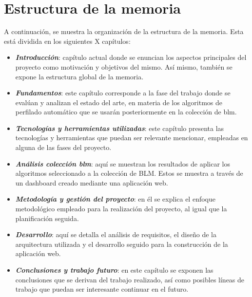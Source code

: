 \section{Estructura de la memoria}
A continuación, se muestra la organización de la estructura de la memoria. Esta está dividida en los siguientes X capítulos:
\begin{itemize}
    \item \textit{\textbf{Introducción}}: capítulo actual donde se enuncian los aspectos principales del proyecto como motivación y objetivos del mismo. Así mismo, también se expone la estructura global de la memoria.
    \item \textit{\textbf{Fundamentos}}: este capítulo corresponde a la fase del trabajo donde se evalúan y analizan el estado del arte, en materia de los algoritmos de perfilado automático que se usarán posteriormente en la colección de \acrshort{blm}.
    \item \textit{\textbf{Tecnologías y herramientas utilizadas}}: este capítulo presenta las tecnologías y herramientas que puedan ser relevante mencionar, empleadas en alguna de las fases del proyecto.
    \item \textit{\textbf{Análisis colección \acrshort{blm}}}: aquí se muestran los resultados de aplicar los algoritmos seleccionado a la colección de BLM. Estos se muestra a través de un dashboard creado mediante una aplicación web.
    \item \textit{\textbf{Metodología y gestión del proyecto}}: en él se explica el enfoque metodológico empleado para la realización del proyecto, al igual que la planificación seguida.
    \item \textit{\textbf{Desarrollo}}: aquí se detalla el análisis de requisitos, el diseño de la arquitectura utilizada y el desarrollo seguido para la construcción de la aplicación web.
    \item \textit{\textbf{Conclusiones y trabajo futuro}}: en este capítulo se exponen las conclusiones que se derivan del trabajo realizado, así como posibles líneas de trabajo que puedan ser interesante continuar en el futuro.
\end{itemize}
\
\label{sec:mostra}
